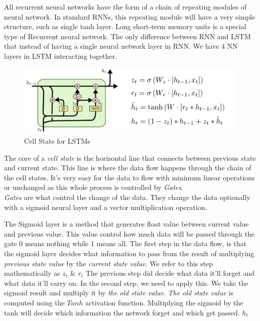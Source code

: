 All recurrent neural networks have the form of a chain of repeating modules of neural network. In standard RNNs, this repeating module will have a very simple structure, such as single tanh layer.
Long short-term memory units is a special type of Recurrent neural network.
The only difference between RNN and LSTM that instead of having a single neural network layer in RNN. We have 4 NN layers in LSTM interacting together.

\vspace{1cm}

\begin{figure}[ht]
    \centering
    \includegraphics[scale=0.5]{Images/LSTM3-var-GRU.png}
    \caption{Cell State for LSTMs}
    \label{fig:lstm}
\end{figure}

\vspace{1cm}

\vspace{1 cm}

The core of a \textit{cell state} is the horizontal line that connects between previous state and current state. This line is where the data flow happens through the chain of the cell states. It’s very easy for the data to flow with minimum linear operations or unchanged as this whole process is controlled by \textit{Gates}.\\
\textit{Gates} are what control the change of the data. They change the data optionally with a sigmoid neural layer and a vector multiplication operation.

\vspace{0.5cm}

The Sigmoid layer is a method that generates float value between current value and previous value. This value control how much data will be passed through the gate 0 means nothing while 1 means all.
The first step in the data flow, is that the sigmoid layer decides what information to pass from the result of multiplying \textit{previous state value} by the \textit{current state value}. We refer to this step mathematically as $z_t$ & $r_t$ 
The previous step did decide what data it’ll forget and what data it’ll carry on. In the second step, we need to apply this.
We take the sigmoid result and multiply it by \textit{the old state value}. \textit{The old state value} is computed using the $Tanh$ activation function. 
Multiplying the sigmoid by the tanh will decide which information the network forget and which get passed. $h^{~}_t$

